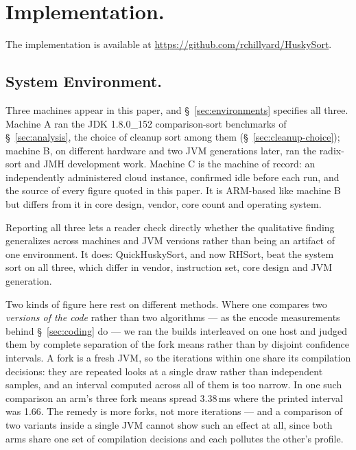 \documentclass[twoside,leqno,twocolumn]{article}
\newif\ifanonymous
\begin{document}
\section{Implementation.}

\ifanonymous
  The implementation, its tests and the benchmark harness are available at
  \url{https://anonymous.4open.science/r/radix-proxy-key-sort-artifact-D8B1/}.
\else
  The implementation is available at \url{https://github.com/rchillyard/HuskySort}.
\fi

\subsection{System Environment.}

Three machines appear in this paper, and \S~\ref{sec:environments} specifies all three.
Machine A ran the JDK 1.8.0\_152 comparison-sort benchmarks of \S~\ref{sec:analysis},
the choice of cleanup sort among them (\S~\ref{sec:cleanup-choice});
machine B, on different hardware and two JVM generations later, ran the radix-sort and JMH development work.
Machine C is the machine of record: an independently administered cloud instance, confirmed idle before
each run, and the source of every figure quoted in this paper.
It is ARM-based like machine B but differs from it in core design, vendor, core count and operating system.

Reporting all three lets a reader check directly whether the qualitative finding generalizes across
machines and JVM versions rather than being an artifact of one environment.
It does: QuickHuskySort, and now RHSort, beat the system sort on all three,
which differ in vendor, instruction set, core design and JVM generation.

Two kinds of figure here rest on different methods.
Where one compares two \emph{versions of the code} rather than two algorithms --- as the encode
measurements behind \S~\ref{sec:coding} do --- we ran the builds interleaved on one host and judged
them by complete separation of the fork means rather than by disjoint confidence intervals.
A fork is a fresh JVM, so the iterations within one share its compilation decisions: they are repeated
looks at a single draw rather than independent samples, and an interval computed across all of them is
too narrow.
In one such comparison an arm's three fork means spread 3.38\,ms where the printed interval was 1.66.
The remedy is more forks, not more iterations --- and a comparison of two variants inside a single JVM
cannot show such an effect at all, since both arms share one set of compilation decisions and each
pollutes the other's profile.
\end{document}
